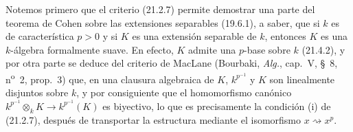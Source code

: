 \begin{env}[21.5.1]
\label{0.21.5.1-fr}
Notemos primero que el criterio (21.2.7) permite demostrar una parte del
teorema de Cohen sobre las extensiones separables (19.6.1), a saber, que si $k$
es de característica $p>0$ y si $K$ es una extensión separable de $k$,
entonces $K$ es una $k$-álgebra formalmente suave. En efecto, $K$ admite una
$p$-base sobre $k$ (21.4.2), y por otra parte se deduce del criterio de MacLane
(Bourbaki, \emph{Alg.}, cap.~V, §~8, n\textsuperscript{o}~2, prop.~3) que, en una
clausura algebraica de $K$, $k^{p^{-1}}$ y $K$ son linealmente disjuntos sobre
$k$, y por consiguiente que el homomorfismo canónico
$k^{p^{-1}}\otimes_k K\to k^{p^{-1}}(K)$ es biyectivo, lo que es precisamente
la condición (i) de (21.2.7), después de transportar la estructura mediante el
isomorfismo $x\rightsquigarrow x^p$.
\end{env}
